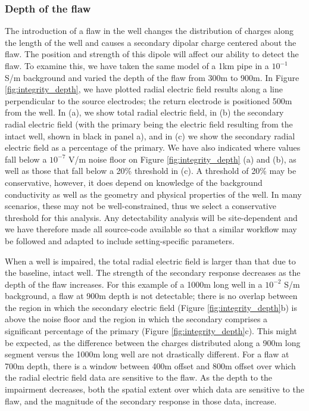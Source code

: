 \subsubsection{Depth of the flaw}
The introduction of a flaw in the well changes the distribution of charges along the length of the well and causes a secondary dipolar charge centered about the flaw. The position and strength of this dipole will affect our ability to detect the flaw. To examine this, we have taken the same model of a 1km pipe in a $10^{-1}$ S/m background and varied the depth of the flaw from 300m to 900m. In Figure \ref{fig:integrity_depth}, we have plotted radial electric field results along a line perpendicular to the source electrodes; the return electrode is positioned 500m from the well. In (a), we show total radial electric field, in (b) the secondary radial electric field (with the primary being the electric field resulting from the intact well, shown in black in panel a), and in (c) we show the secondary radial electric field as a percentage of the primary. We have also indicated where values fall below a $10^{-7}$ V/m noise floor on Figure \ref{fig:integrity_depth} (a) and (b), as well as those that fall below a 20\% threshold in (c). A threshold of 20\% may be conservative, however, it does depend on knowledge of the background conductivity as well as the geometry and physical properties of the well. In many scenarios, these may not be well-constrained, thus we select a conservative threshold for this analysis. Any detectability analysis will be site-dependent and we have therefore made all source-code available so that a similar workflow may be followed and adapted to include setting-specific parameters.

When a well is impaired, the total radial electric field is larger than that due to the baseline, intact well. The strength of the secondary response decreases as the depth of the flaw increases. For this example of a 1000m long well in a $10^{-2}$ S/m background, a flaw at 900m depth is not detectable; there is no overlap between the region in which the secondary electric field (Figure \ref{fig:integrity_depth}b) is above the noise floor and the region in which the secondary comprises a significant percentage of the primary (Figure \ref{fig:integrity_depth}c). This might be expected, as the difference between the charges distributed along a 900m long segment versus the 1000m long well are not drastically different. For a flaw at 700m depth, there is a window between 400m offset and 800m offset over which the radial electric field data are sensitive to the flaw. As the depth to the impairment decreases, both the spatial extent over which data are sensitive to the flaw, and the magnitude of the secondary response in those data, increase.



